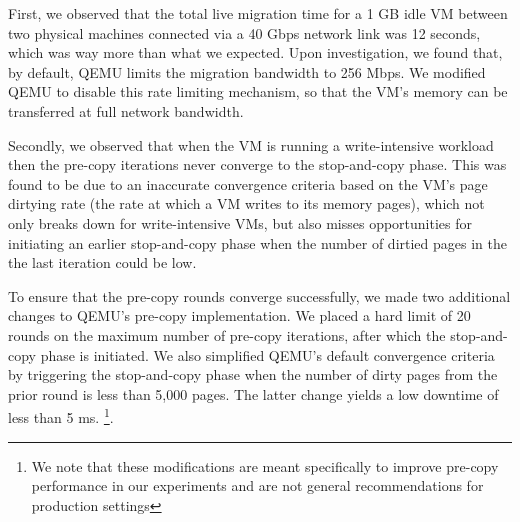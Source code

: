 First, we observed that the total live migration time for a 1 GB idle VM between two
physical machines connected via a 40 Gbps 
network link was 12 seconds, which was way more than what we expected. 
Upon investigation, we found that, by default, QEMU limits the migration bandwidth to 256 Mbps. 
We modified QEMU to disable this rate limiting mechanism, 
so that the VM's memory can be transferred at full network bandwidth.

Secondly, we observed that when the VM is running a write-intensive workload
then the pre-copy iterations never converge to the stop-and-copy phase.
This was found to be due to an inaccurate convergence criteria
based on the VM's page dirtying rate (the rate at which a VM writes to its memory pages), 
which not only breaks down for write-intensive VMs, 
but also misses opportunities for initiating an earlier stop-and-copy phase 
when the number of dirtied pages in the the last iteration could be low. 

To ensure that the pre-copy rounds converge successfully, we made two additional changes
to QEMU's pre-copy implementation. We placed a hard limit of 20 rounds on the 
maximum number of pre-copy iterations, after which the stop-and-copy phase is initiated.
We also simplified QEMU's default convergence criteria by triggering the
stop-and-copy phase when the number of dirty pages from the prior round is less than 5,000 pages.
The latter change yields a low downtime of less than 5 ms.
\footnote{We note that these modifications are meant specifically to improve pre-copy performance in 
our experiments and are not general recommendations for production settings}.




